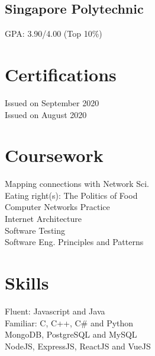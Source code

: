 \documentclass[a4paper]{deedy-resume-openfont} %
\begin{document}
\begin{minipage}[t]{0.34\textwidth}
\subsection{Singapore Polytechnic}
GPA: 3.90/4.00 (Top 10\%)
\sectionsep


\section{Certifications}
Issued on September 2020\\
Issued on August 2020
\sectionsep


\section{Coursework}
Mapping connections with Network Sci.\\
Eating right(s): The Politics of Food\\
Computer Networks Practice\\ 
Internet Architecture\\ 
Software Testing\\ 
Software Eng. Principles and Patterns\\ 
\sectionsep


\section{Skills}
Fluent: Javascript and Java\\
Familiar: C, C++, C\# and Python\\
MongoDB, PostgreSQL and MySQL \\
NodeJS, ExpressJS, ReactJS and VueJS
\sectionsep

%
%

\end{minipage} 
\end{document}
